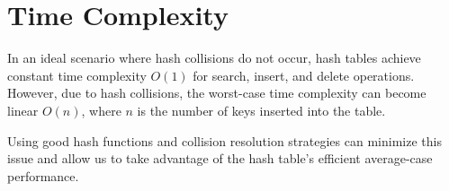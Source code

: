 \section{Time Complexity}

In an ideal scenario where hash collisions do not occur, hash tables
achieve constant time complexity $O(1)$ for search, insert, and delete
operations. However, due to hash collisions, the worst-case time
complexity can become linear $O(n)$, where $n$ is the number of keys
inserted into the table.

Using good hash functions and collision resolution strategies can
minimize this issue and allow us to take advantage of the hash table's
efficient average-case performance.

